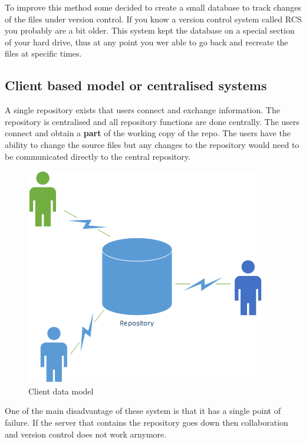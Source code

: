 \documentclass[
]{book}
\begin{document}
To improve this method some decided to create a small database to track changes of the files under version control.
If you know a version control system called RCS you probably are a bit older. This system kept the database on a special section of your hard drive, thus at any point you wer able to go back and recreate the files at specific times.

\hypertarget{client-based-model-or-centralised-systems}{%
\subsection*{Client based model or centralised systems}\label{client-based-model-or-centralised-systems}}

A single repository exists that users connect and exchange information. The repository is centralised and all repository functions are done centrally. The users connect and obtain a \textbf{part} of the working copy of the repo. The users have the ability to change the source files but any changes to the repository would need to be communicated directly to the central repository.

\begin{figure}

{\centering \includegraphics[width=0.6\linewidth]{images/Client Data Model Example} 

}

\caption{Client data model}\label{fig:unnamed-chunk-2}
\end{figure}

One of the main disadvantage of these system is that it has a single point of failure. If the server that contains the repository goes down then collaboration and version control does not work arnymore.
\end{document}
